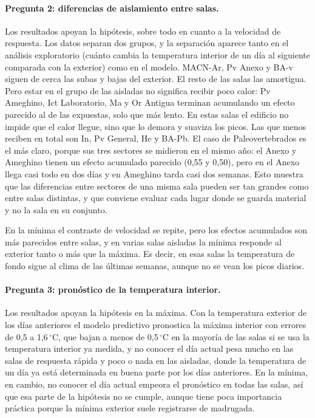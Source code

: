 \documentclass[11pt,a4paper]{article}
\begin{document}
\paragraph{Pregunta 2: diferencias de aislamiento entre salas.} Los resultados apoyan la hipótesis, sobre todo en cuanto a la velocidad de respuesta. Los datos separan dos grupos, y la separación aparece tanto en el análisis exploratorio (cuánto cambia la temperatura interior de un día al siguiente comparada con la exterior) como en el modelo. MACN-Ar, Pv Anexo y BA-v siguen de cerca las subas y bajas del exterior. El resto de las salas las amortigua. Pero estar en el grupo de las aisladas no significa recibir poco calor: Pv Ameghino, Ict Laboratorio, Ma y Or Antigua terminan acumulando un efecto parecido al de las expuestas, solo que más lento. En estas salas el edificio no impide que el calor llegue, sino que lo demora y suaviza los picos. Las que menos reciben en total son In, Pv General, He y BA-Pb. El caso de Paleovertebrados es el más claro, porque sus tres sectores se midieron en el mismo año: el Anexo y Ameghino tienen un efecto acumulado parecido (0{,}55 y 0{,}50), pero en el Anexo llega casi todo en dos días y en Ameghino tarda casi dos semanas. Esto muestra que las diferencias entre sectores de una misma sala pueden ser tan grandes como entre salas distintas, y que conviene evaluar cada lugar donde se guarda material y no la sala en su conjunto.

En la mínima el contraste de velocidad se repite, pero los efectos acumulados son más parecidos entre salas, y en varias salas aisladas la mínima responde al exterior tanto o más que la máxima. Es decir, en esas salas la temperatura de fondo sigue al clima de las últimas semanas, aunque no se vean los picos diarios.

\paragraph{Pregunta 3: pronóstico de la temperatura interior.} Los resultados apoyan la hipótesis en la máxima. Con la temperatura exterior de los días anteriores el modelo predictivo pronostica la máxima interior con errores de 0{,}5 a 1{,}6\,$^\circ$C, que bajan a menos de 0{,}5\,$^\circ$C en la mayoría de las salas si se usa la temperatura interior ya medida, y no conocer el día actual pesa mucho en las salas de respuesta rápida y poco o nada en las aisladas, donde la temperatura de un día ya está determinada en buena parte por los días anteriores. En la mínima, en cambio, no conocer el día actual empeora el pronóstico en todas las salas, así que esa parte de la hipótesis no se cumple, aunque tiene poca importancia práctica porque la mínima exterior suele registrarse de madrugada.
\end{document}
